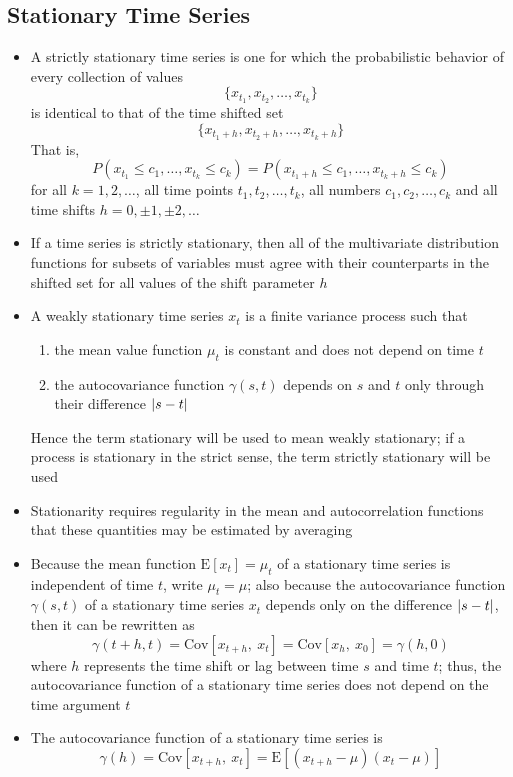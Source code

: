 \documentclass[12pt]{article}
\newcommand{\expe}[1]{\text{E}\left[ #1 \right]}
\newcommand{\cov}[2]{\text{Cov}\left[#1, ~#2\right]}
\begin{document}
\subsection{Stationary Time Series}
\begin{itemize}
\item A strictly stationary time series is one for which the probabilistic behavior of every collection of values $$\{x_{t_1},x_{t_2},\dots,x_{t_k}\} $$ is identical to that of the time shifted set $$ \{x_{t_1 + h},x_{t_2 + h},\dots,x_{t_k+h}\} $$ That is, $$ P(x_{t_1} \leq c_1,\dots,x_{t_k} \leq c_k) = P(x_{t_1 + h} \leq c_1,\dots,x_{t_k + h} \leq c_k) $$ for all $k=1,2,\dots$, all time points $t_1,t_2,\dots,t_k$, all numbers $c_1,c_2,\dots,c_k$ and all time shifts $h = 0, \pm 1, \pm 2,\dots$
\item If a time series is strictly stationary, then all of the multivariate distribution functions for subsets of variables must agree with their counterparts in the shifted set for all values of the shift parameter $h$ 
\item A weakly stationary time series $x_t$ is a finite variance process such that \begin{enumerate}
\item the mean value function $\mu_t$ is constant and does not depend on time $t$ 
\item the autocovariance function $\gamma(s,t)$ depends on $s$ and $t$ only through their difference $\abs{s-t}$ \end{enumerate} 
Hence the term stationary will be used to mean weakly stationary; if a process is stationary in the strict sense, the term strictly stationary will be used
\item Stationarity requires regularity in the mean and autocorrelation functions that these quantities may be estimated by averaging 
\item Because the mean function $\expe{x_t} = \mu_t$ of a stationary time series is independent of time $t$, write $\mu_t = \mu$; also because the autocovariance function $\gamma(s,t)$ of a stationary time series $x_t$ depends only on the difference $\abs{s-t}$, then it can be rewritten as $$ \gamma(t+h, t) = \cov{x_{t+h}}{x_t} = \cov{x_h}{x_0} = \gamma(h,0) $$ where $h$ represents the time shift or lag between time $s$ and time $t$; thus, the autocovariance function of a stationary time series does not depend on the time argument $t$ 
\item The autocovariance function of a stationary time series is $$ \gamma(h) = \cov{x_{t+h}}{x_t} = \expe{(x_{t+h} - \mu)(x_t - \mu)} $$ 

\end{itemize}
\end{document}

